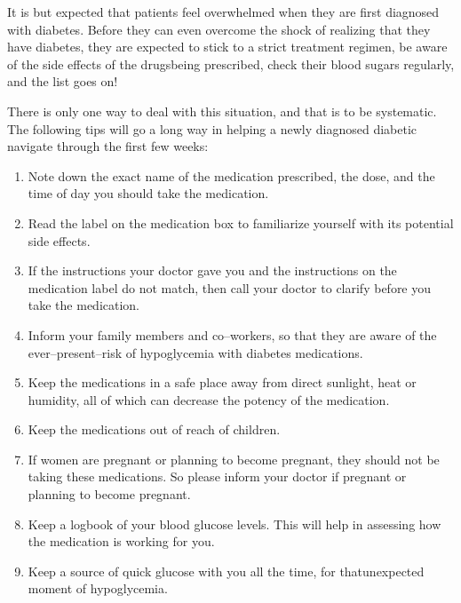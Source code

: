 
It is but expected that patients feel overwhelmed when they are first diagnosed with diabetes. Before they can even overcome the shock of realizing that they have diabetes, they are expected to stick to a strict treatment regimen, be aware of the side effects of the drugs\break being prescribed, check their blood sugars regularly, and the list goes on!

There is only one way to deal with this situation, and that is to be systematic. The following tips will go a long way in helping a newly diagnosed diabetic navigate through the first few weeks:

\vspace{-\topsep}
\begin{enumerate}[•]
\itemsep=0pt
\item Note down the exact name of the medication prescribed, the dose, and the time of day you should take the medication.
\item Read the label on the medication box to familiarize yourself with its potential side effects.
\item If the instructions your doctor gave you and the instructions on the medication label do not match, then call your doctor to clarify before you take the medication.
\item Inform your family members and co–workers, so that they are aware of the ever–present–risk of hypoglycemia with diabetes medications.
\item Keep the medications in a safe place away from direct sunlight, heat or humidity, all of which can decrease the potency of the medication.
\item Keep the medications out of reach of children.
\item If women are pregnant or planning to become pregnant, they should not be taking these medications. So please inform your doctor if pregnant or planning to become pregnant.
\item Keep a logbook of your blood glucose levels. This will help in asse\-ssing how the medication is working for you.
\item Keep a source of quick glucose with you all the time, for that\break unexpected moment of hypoglycemia.
\end{enumerate}
\vspace{-\topsep}


